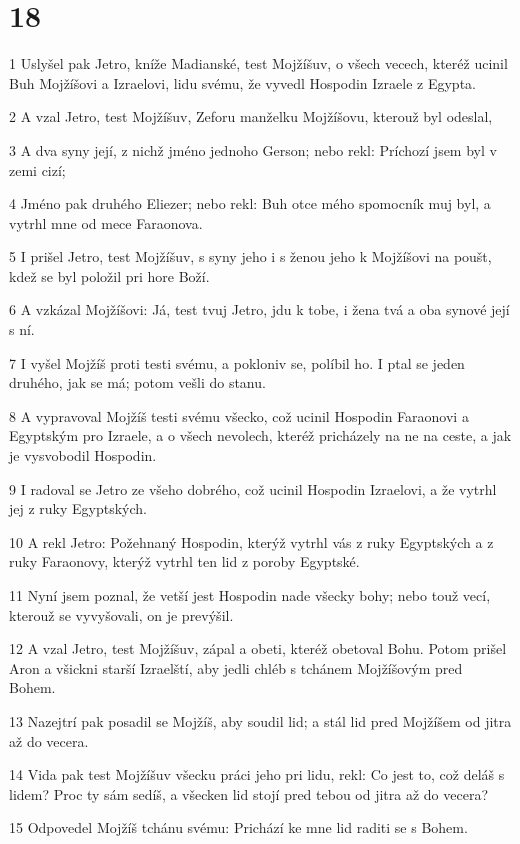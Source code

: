 \chapter{18}

\par 1 Uslyšel pak Jetro, kníže Madianské, test Mojžíšuv, o všech vecech, kteréž ucinil Buh Mojžíšovi a Izraelovi, lidu svému, že vyvedl Hospodin Izraele z Egypta.
\par 2 A vzal Jetro, test Mojžíšuv, Zeforu manželku Mojžíšovu, kterouž byl odeslal,
\par 3 A dva syny její, z nichž jméno jednoho Gerson; nebo rekl: Príchozí jsem byl v zemi cizí;
\par 4 Jméno pak druhého Eliezer; nebo rekl: Buh otce mého spomocník muj byl, a vytrhl mne od mece Faraonova.
\par 5 I prišel Jetro, test Mojžíšuv, s syny jeho i s ženou jeho k Mojžíšovi na poušt, kdež se byl položil pri hore Boží.
\par 6 A vzkázal Mojžíšovi: Já, test tvuj Jetro, jdu k tobe, i žena tvá a oba synové její s ní.
\par 7 I vyšel Mojžíš proti testi svému, a pokloniv se, políbil ho. I ptal se jeden druhého, jak se má; potom vešli do stanu.
\par 8 A vypravoval Mojžíš testi svému všecko, což ucinil Hospodin Faraonovi a Egyptským pro Izraele, a o všech nevolech, kteréž pricházely na ne na ceste, a jak je vysvobodil Hospodin.
\par 9 I radoval se Jetro ze všeho dobrého, což ucinil Hospodin Izraelovi, a že vytrhl jej z ruky Egyptských.
\par 10 A rekl Jetro: Požehnaný Hospodin, kterýž vytrhl vás z ruky Egyptských a z ruky Faraonovy, kterýž vytrhl ten lid z poroby Egyptské.
\par 11 Nyní jsem poznal, že vetší jest Hospodin nade všecky bohy; nebo touž vecí, kterouž se vyvyšovali, on je prevýšil.
\par 12 A vzal Jetro, test Mojžíšuv, zápal a obeti, kteréž obetoval Bohu. Potom prišel Aron a všickni starší Izraelští, aby jedli chléb s tchánem Mojžíšovým pred Bohem.
\par 13 Nazejtrí pak posadil se Mojžíš, aby soudil lid; a stál lid pred Mojžíšem od jitra až do vecera.
\par 14 Vida pak test Mojžíšuv všecku práci jeho pri lidu, rekl: Co jest to, což deláš s lidem? Proc ty sám sedíš, a všecken lid stojí pred tebou od jitra až do vecera?
\par 15 Odpovedel Mojžíš tchánu svému: Prichází ke mne lid raditi se s Bohem.
